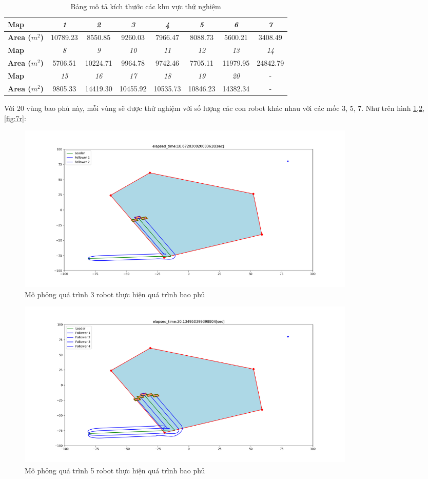 \begin{table}[H]
\centering
\caption{Bảng mô tả kích thước các khu vực thử nghiệm}
\label{tab:Scoverage1}
\begin{tabular}{|l|c|c|c|c|c|c|c|}
\hline
\textbf{Map}      & \textit{1}  & \textit{2}  & \textit{3}  & \textit{4}  & \textit{5}  & \textit{6}  & \textit{7}  \\ \hline
\textbf{Area ($m^2$)} & 10789.23    & 8550.85     & 9260.03     & 7966.47     & 8088.73     & 5600.21     & 3408.49  \\ \hline
\textbf{Map}      & \textit{8}  &\textit{9}   & \textit{10} & \textit{11} & \textit{12} & \textit{13} & \textit{14}    \\ \hline
\textbf{Area ($m^2$)}  & 5706.51   & 10224.71    & 9964.78     &9742.46     & 7705.11     & 11979.95    & 24842.79 \\ \hline
\textbf{Map}     & \textit{15} & \textit{16} & \textit{17}   & \textit{18} & \textit{19} & \textit{20}  & - \\ \hline
\textbf{Area ($m^2$)} & 9805.33     & 14419.30  & 10455.92    & 10535.73    & 10846.23    & 14382.34  & - \\ \hline
\end{tabular}
\end{table}

Với 20 vùng bao phủ này, mỗi vùng sẽ được thử nghiệm với số lượng các con robot khác nhau với các mốc 3, 5, 7. Như trên hình \ref{fig:3r},\ref{fig:5r},\ref{fig:7r}:

\begin{figure}[H]
    \centering
    \includegraphics[width=0.8\textwidth]{chapter5/image/3robot.png}
    \caption{Mô phỏng quá trình 3 robot thực hiện quá trình bao phủ}
    \label{fig:3r}
\end{figure}

\begin{figure}[H]
    \centering
    \includegraphics[width=0.8\textwidth]{chapter5/image/5robot.png}
    \caption{Mô phỏng quá trình 5 robot thực hiện quá trình bao phủ}
    \label{fig:5r}
\end{figure}

